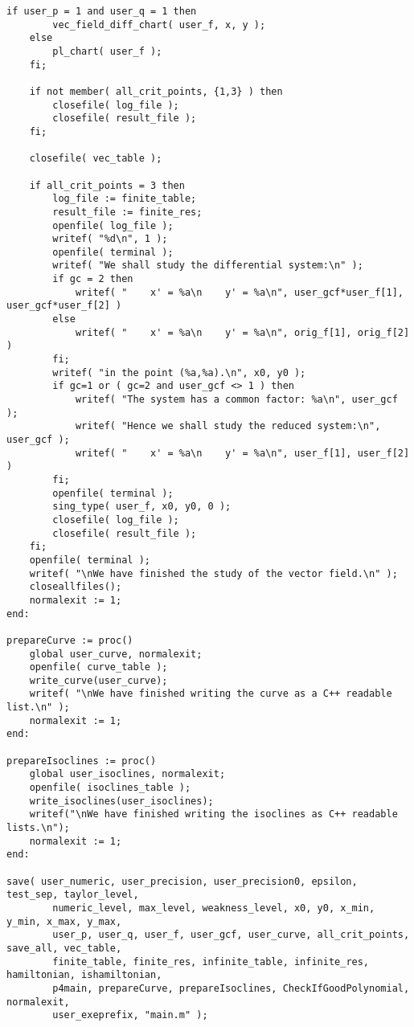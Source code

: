 \documentclass[a4paper,10pt]{article}
\begin{document}
\begin{lstlisting}[name=main]
    if user_p = 1 and user_q = 1 then
        vec_field_diff_chart( user_f, x, y );
    else
        pl_chart( user_f );
    fi;

    if not member( all_crit_points, {1,3} ) then
        closefile( log_file );
        closefile( result_file );
    fi;

    closefile( vec_table );

    if all_crit_points = 3 then
        log_file := finite_table;
        result_file := finite_res;
        openfile( log_file );
        writef( "%d\n", 1 );
        openfile( terminal );
        writef( "We shall study the differential system:\n" );
        if gc = 2 then
            writef( "    x' = %a\n    y' = %a\n", user_gcf*user_f[1], user_gcf*user_f[2] )
        else
            writef( "    x' = %a\n    y' = %a\n", orig_f[1], orig_f[2] )
        fi;
        writef( "in the point (%a,%a).\n", x0, y0 );
        if gc=1 or ( gc=2 and user_gcf <> 1 ) then
            writef( "The system has a common factor: %a\n", user_gcf );
            writef( "Hence we shall study the reduced system:\n", user_gcf );
            writef( "    x' = %a\n    y' = %a\n", user_f[1], user_f[2] )
        fi;
        openfile( terminal );
        sing_type( user_f, x0, y0, 0 );
        closefile( log_file );
        closefile( result_file );
    fi;
    openfile( terminal );
    writef( "\nWe have finished the study of the vector field.\n" );
    closeallfiles();
    normalexit := 1;
end:

prepareCurve := proc()
    global user_curve, normalexit;
    openfile( curve_table );
    write_curve(user_curve);
    writef( "\nWe have finished writing the curve as a C++ readable list.\n" );    
    normalexit := 1;
end:

prepareIsoclines := proc()
    global user_isoclines, normalexit;
    openfile( isoclines_table );
    write_isoclines(user_isoclines);
    writef("\nWe have finished writing the isoclines as C++ readable lists.\n");
    normalexit := 1;
end:

save( user_numeric, user_precision, user_precision0, epsilon, test_sep, taylor_level, 
        numeric_level, max_level, weakness_level, x0, y0, x_min, y_min, x_max, y_max,
        user_p, user_q, user_f, user_gcf, user_curve, all_crit_points, save_all, vec_table,
        finite_table, finite_res, infinite_table, infinite_res, hamiltonian, ishamiltonian,
        p4main, prepareCurve, prepareIsoclines, CheckIfGoodPolynomial, normalexit,
        user_exeprefix, "main.m" );


\end{lstlisting}
\end{document}
